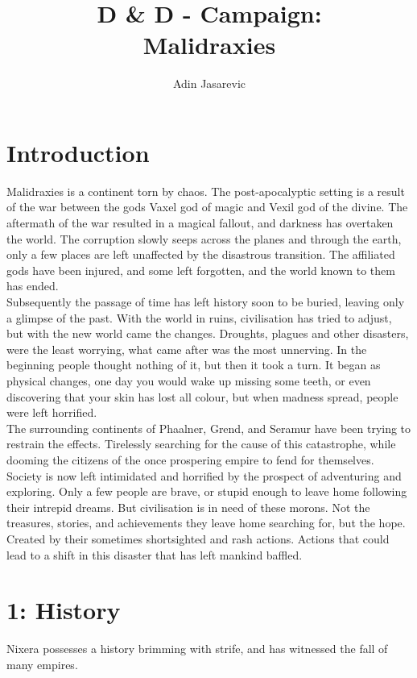 \documentclass[a4paper]{book}
\title{D \& D - Campaign: \\ Malidraxies}
\author{Adin Jasarevic}
\begin{document}
\begin{titlepage}
\maketitle
\end{titlepage}
\makeatletter
\renewcommand\thesection{}
\renewcommand\thesubsection{\@arabic\c@section.\@arabic\c@subsection}
\makeatother
\section{Introduction}
Malidraxies is a continent torn by chaos. The post-apocalyptic setting is a result of the war between the gods Vaxel god of magic and Vexil god of the divine. The aftermath of the war resulted in a magical fallout, and darkness has overtaken the world. The corruption slowly seeps across the planes and through the earth, only a few places are left unaffected by the disastrous transition. The affiliated gods have been injured, and some left forgotten, and the world known to them has ended.\\ Subsequently the passage of time has left history soon to be buried, leaving only a glimpse of the past. With the world in ruins, civilisation has tried to adjust, but with the new world came the changes. Droughts, plagues and other disasters, were the least worrying, what came after was the most unnerving. In the beginning people thought nothing of it, but then it took a turn. It began as physical changes, one day you would wake up missing some teeth, or even discovering that your skin has lost all colour, but when madness spread, people were left horrified.\\
The surrounding continents of Phaalner, Grend, and Seramur have been trying to restrain the effects. Tirelessly searching for the cause of this catastrophe, while dooming the citizens of the once prospering empire to fend for themselves.\\
Society is now left intimidated and horrified by the prospect of adventuring and exploring. Only a few people are brave, or stupid enough to leave home following their intrepid dreams. But civilisation is in need of these morons. Not the treasures, stories, and achievements they leave home searching for, but the hope. Created by their sometimes shortsighted and rash actions. Actions that could lead to a shift in this disaster that has left mankind baffled.
\tableofcontents
\newpage

\section{1: History}
Nixera possesses a history brimming with strife, and has witnessed the fall of many empires.
\end{document}
